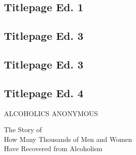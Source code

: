 
\begin{titlingpage}


\begin{biblechapter}
\section*{Titlepage Ed. 1}
\end{biblechapter}


\newpage
\begin{biblechapter}
\section*{Titlepage Ed. 3}
\end{biblechapter}


\newpage
\begin{biblechapter}
\section*{Titlepage Ed. 3}
\end{biblechapter}


\newpage
\begin{biblechapter}
\section*{Titlepage Ed. 4}
\vspace*{9em}

{\centering\Huge
        ALCOHOLICS ANONYMOUS \\
}

\vspace{5em}

{\hfill\itshape 

The Story of \\

How Many Thousands of Men and Women \\

Have Recovered from Alcoholism \\
}
\end{biblechapter}

\end{titlingpage}

